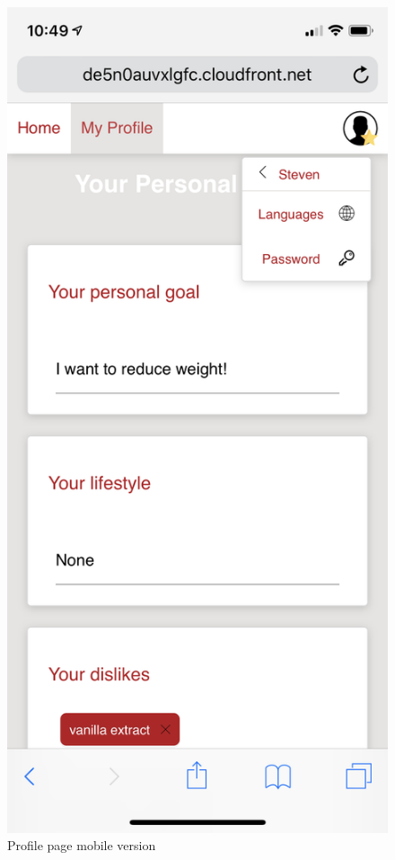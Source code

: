 \vspace{-2em}
\begin{figure}[H]
	\captionsetup{justification=centering}
	\begin{center}
		\includegraphics[scale=0.25]{Ressourcen/img/screenshots/iphoneB.png}
		\vspace{-3em}
		\caption{Profile page mobile version}
	\end{center}
\end{figure}

